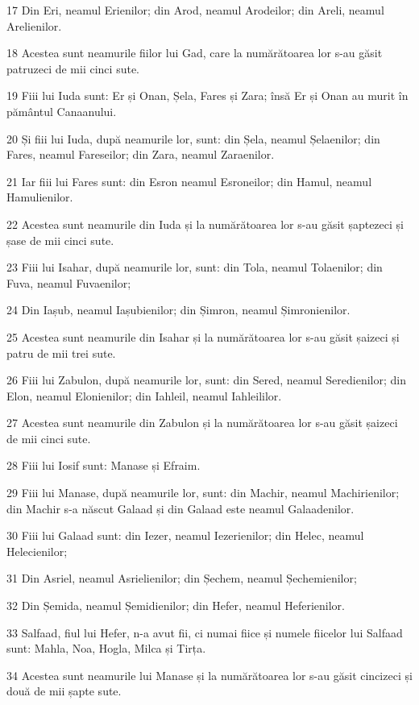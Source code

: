 \par 17 Din Eri, neamul Erienilor; din Arod, neamul Arodeilor; din Areli, neamul Arelienilor.
\par 18 Acestea sunt neamurile fiilor lui Gad, care la numărătoarea lor s-au găsit patruzeci de mii cinci sute.
\par 19 Fiii lui Iuda sunt: Er și Onan, Șela, Fares și Zara; însă Er și Onan au murit în pământul Canaanului.
\par 20 Și fiii lui Iuda, după neamurile lor, sunt: din Șela, neamul Șelaenilor; din Fares, neamul Fareseilor; din Zara, neamul Zaraenilor.
\par 21 Iar fiii lui Fares sunt: din Esron neamul Esroneilor; din Hamul, neamul Hamulienilor.
\par 22 Acestea sunt neamurile din Iuda și la numărătoarea lor s-au găsit șaptezeci și șase de mii cinci sute.
\par 23 Fiii lui Isahar, după neamurile lor, sunt: din Tola, neamul Tolaenilor; din Fuva, neamul Fuvaenilor;
\par 24 Din Iașub, neamul Iașubienilor; din Șimron, neamul Șimronienilor.
\par 25 Acestea sunt neamurile din Isahar și la numărătoarea lor s-au găsit șaizeci și patru de mii trei sute.
\par 26 Fiii lui Zabulon, după neamurile lor, sunt: din Sered, neamul Seredienilor; din Elon, neamul Elonienilor; din Iahleil, neamul Iahleililor.
\par 27 Acestea sunt neamurile din Zabulon și la numărătoarea lor s-au găsit șaizeci de mii cinci sute.
\par 28 Fiii lui Iosif sunt: Manase și Efraim.
\par 29 Fiii lui Manase, după neamurile lor, sunt: din Machir, neamul Machirienilor; din Machir s-a născut Galaad și din Galaad este neamul Galaadenilor.
\par 30 Fiii lui Galaad sunt: din Iezer, neamul Iezerienilor; din Helec, neamul Helecienilor;
\par 31 Din Asriel, neamul Asrielienilor; din Șechem, neamul Șechemienilor;
\par 32 Din Șemida, neamul Șemidienilor; din Hefer, neamul Heferienilor.
\par 33 Salfaad, fiul lui Hefer, n-a avut fii, ci numai fiice și numele fiicelor lui Salfaad sunt: Mahla, Noa, Hogla, Milca și Tirța.
\par 34 Acestea sunt neamurile lui Manase și la numărătoarea lor s-au găsit cincizeci și două de mii șapte sute.

